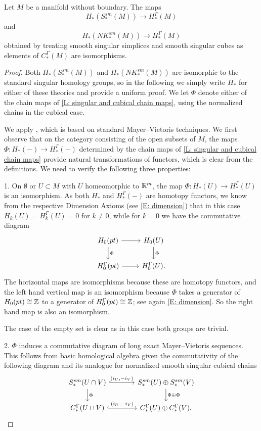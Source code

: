 \begin{theorem}\label{T: hom iso map}
	Let $M$ be a manifold without boundary.
	The maps $$H_*(S^{sm}_*(M)) \to H_*^\Gamma(M)$$ and $$H_*(NK^{sm}_*(M)) \to H_*^\Gamma(M)$$ obtained by treating smooth singular simplices and smooth singular cubes as elements of $C_*^\Gamma(M)$ are isomorphisms.
\end{theorem}

\begin{proof}
	Both $H_*(S^{sm}_*(M))$ and $H_*(NK^{sm}_*(M))$ are isomorphic to the standard singular homology groups, so in the following we simply write $H_*$ for either of these theories and provide a uniform proof.
	We let $\Phi$ denote either of the chain maps of \cref{L: singular and cubical chain maps}, using the normalized chains in the cubical case.

	We apply \cite[Theorem 5.1.1]{Frie20}, which is based on standard Mayer--Vietoris techniques.
	We first observe that on the category consisting of the open subsets of $M$, the maps $\Phi: H_*(-) \to H_*^\Gamma(-)$ determined by the chain maps of \cref{L: singular and cubical chain maps} provide natural transformations of functors, which is clear from the definitions.
	We need to verify the following three properties:

	1.
	On $\emptyset$ or $U \subset M$ with $U$ homeomorphic to $\mathbb{R}^m$, the map $\Phi: H_*(U) \to H_*^\Gamma(U)$ is an isomorphism.
	As both $H_*$ and $H_*^\Gamma(-)$ are homotopy functors, we know from the respective Dimension Axioms (see \cref{E: dimension}) that in this case $H_k(U) = H_k^\Gamma(U) = 0$ for $k\neq 0$, while for $k = 0$ we have the commutative diagram
	\[
	\begin{tikzcd}
		H_0(pt) \arrow[r] \arrow[d, "\Phi"] & H_0(U) \arrow[d, "\Phi"] \\
		H_0^\Gamma(pt) \arrow[r] & H^\Gamma_0(U).
	\end{tikzcd}
	\]
	The horizontal maps are isomorphisms because these are homotopy functors, and the left hand vertical map is an isomorphism because $\Phi$ takes a generator of $H_0(pt) \cong \mathbb{Z}$ to a generator of $H_0^\Gamma(pt) \cong \mathbb{Z}$; see again \cref{E: dimension}.
	So the right hand map is also an isomorphism.

	The case of the empty set is clear as in this case both groups are trivial.

	2.
	$\Phi$ induces a commutative diagram of long exact Mayer--Vietoris sequences.
	This follows from basic homological algebra given the commutativity of the following diagram and its analogue for normalized smooth singular cubical chains
	\[
	\begin{tikzcd}[column sep=large]
		S^{sm}_*(U \cap V) \arrow[r, "{(i_U, -i_V)}", hook] \arrow[d, "\Phi"] & S^{sm}_*(U) \oplus S^{sm}_*(V) \arrow[d, "\Phi \oplus \Phi"] \\
		C_*^\Gamma(U \cap V) \arrow[r, "{(i_U, -i_V)}", hook] & C_*^\Gamma(U) \oplus C_*^\Gamma(V).
	\end{tikzcd}
	\]


\end{proof}
